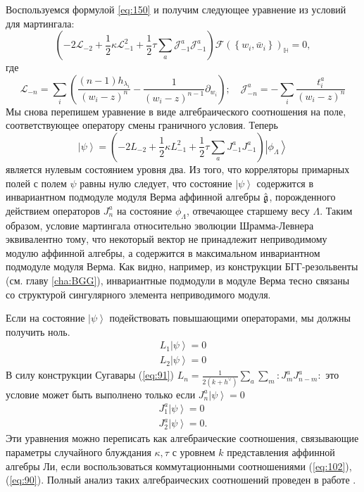 Воспользуемся формулой \eqref{eq:150} и получим следующее уравнение из условий для мартингала:
\begin{equation}
  \left(-2 \mathcal{L}_{-2}+\frac{1}{2}\kappa \mathcal{L}_{-1}^{2}+\frac{1}{2}\tau\sum_{a} \mathcal{J}^{a}_{-1} \mathcal{J}^{a}_{-1}\right)        \mathcal{F}(\left\{w_{i}, \bar w_{i}\right\})_{\mathbb{H}}=0,
  \label{eq:167}
\end{equation}
где
\begin{equation*}
  \mathcal{L}_{-n}=\sum_{i}\left(\frac{(n-1)h_{\lambda_{i}}}{(w_{i}-z)^{n}}-\frac{1}{(w_{i}-z)^{n-1}}\partial_{w_{i}}\right);\quad \mathcal{J}^{a}_{{-n}}=-\sum_{i}\frac{t^{a}_{i}}{(w_{i}-z)^{n}}
\end{equation*}
Мы снова перепишем уравнение в виде алгебраического соотношения на поле, соответствующее оператору смены граничного условия. Теперь
\begin{equation}
  \left| \psi\right>=\left(-2 L_{-2}+\frac{1}{2}\kappa L_{-1}^{2}+\frac{1}{2}\tau\sum_{a} J^{a}_{-1} J^{a}_{-1}\right) \left|\phi_{\Lambda}\right>    
  \label{eq:16}
\end{equation}
является нулевым состоянием уровня два.
Из того, что корреляторы примарных полей с полем $\psi$ равны нулю следует, что состояние $\left|\psi\right>$ содержится в инвариантном подмодуле модуля Верма аффинной алгебры $\hat{\mathfrak{g}}$, порожденного действием операторов $J^a_n$ на состояние $\phi_{\Lambda}$, отвечающее старшему весу $\Lambda$. Таким образом, условие мартингала относительно эволюции Шрамма-Левнера эквивалентно тому, что некоторый вектор не принадлежит неприводимому модулю аффинной алгебры, а содержится в максимальном инвариантном подмодуле модуля Верма. Как видно, например, из конструкции БГГ-резольвенты (см. главу \ref{cha:BGG}), инвариантные подмодули в модуле Верма тесно связаны со структурой сингулярного элемента неприводимого модуля. 

Если на состояние $\left|\psi\right>$ подействовать повышающими операторами, мы должны получить ноль.
\begin{eqnarray}
 \label{eq:34}
 L_{1}\left|\psi\right>=0\\
  L_{2}\left|\psi\right>=0
\end{eqnarray}
В силу конструкции Сугавары (\ref{eq:91}) $  L_n=\frac{1}{2(k+h^{\vee})}\sum_a\sum_m:J^a_m J^a_{n-m}:$ это условие может быть выполнено только если $J^{a}_{n} \left|\psi\right>=0$
\begin{eqnarray}
  \label{eq:36} 
  J^{a}_{1} \left|\psi\right>=0\\
  J^{a}_{2}\left|\psi\right>=0.
\end{eqnarray}
Эти уравнения можно переписать как алгебраические соотношения, связывающие параметры случайного блуждания $\kappa, \tau$ с уровнем  $k$ представления аффинной алгебры Ли, если воспользоваться коммутационными соотношениями  (\ref{eq:102}), (\ref{eq:90}). Полный анализ таких алгебраических соотношений проведен в работе \cite{alekseev2010sle}.

